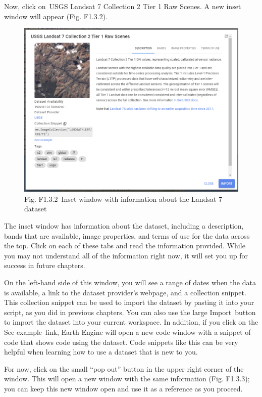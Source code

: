 \documentclass[
  letterpaper,
  DIV=11,
  numbers=noendperiod]{scrreprt}
\begin{document}
Now, click on~USGS Landsat 7 Collection 2 Tier 1 Raw Scenes. A new inset
window will appear (Fig. F1.3.2).

\begin{figure}

{\centering \includegraphics{./F1/image2.png}

}

\caption{Fig. F1.3.2~Inset window with information about the Landsat 7
dataset}

\end{figure}

The inset window has information about the dataset, including a
description, bands that are available, image properties, and terms of
use for the data across the top. Click on each of these tabs and read
the information provided. While you may not understand all of the
information right now, it will set you up for success in future
chapters.

On the left-hand side of this window, you will see a range of dates when
the data is available, a link to the dataset provider's webpage, and a
collection snippet. This collection snippet can be used to import the
dataset by pasting it into your script, as you did in previous chapters.
You can also use the large Import~button to import the dataset into your
current workspace. In addition, if you click on the See example~link,
Earth Engine will open a new code window with a snippet of code that
shows code using the dataset. Code snippets like this can be very
helpful when learning how to use a dataset that is new to you.

For now, click on the small ``pop out'' button in the upper right corner
of the window. This will open a new window with the same information
(Fig. F1.3.3); you can keep this new window open and use it as a
reference as you proceed.
\end{document}
